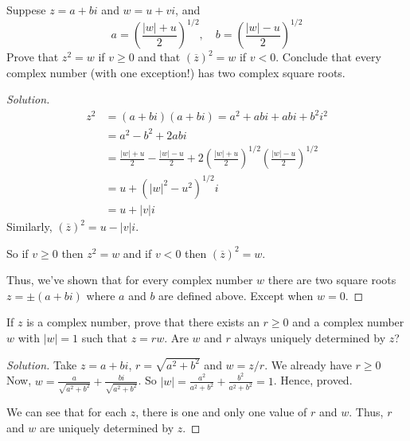 \begin{prblm}
    Suppese $z = a + bi$ and $w = u + vi$, and 
    $$  a = \left( \frac{|w| + u}{2} \right)^{1/2} , \quad
        b = \left( \frac{|w| - u}{2} \right)^{1/2} $$
    Prove that $z^2 = w$ if $v \geq 0$ and that $(\overline{z})^2 = w$ if $v < 0$.
    Conclude that every complex number (with one exception!) has two complex square roots.

    \begin{proof}[Solution]
        \begin{align*}
            z^2 & = (a + bi)(a + bi) = a^2 + abi + abi + b^2 i^2 \\
                & = a^2 - b^2 + 2abi \\
                & = \frac{|w|+u}{2} - \frac{|w|-u}{2} 
                    + 2 \left( \frac{|w|+u}{2} \right)^{1/2} \left( \frac{|w|-u}{2} \right)^{1/2} \\
                & = u + (|w|^2 - u^2)^{1/2} i \\
                & = u + |v|i
        \end{align*}
        Similarly, $(\overline{z})^2 = u - |v|i$. 
        
        So if $v \geq 0$ then $z^2 = w$ and if $v < 0$ then $(\overline{z})^2 = w$.

        Thus, we've shown that for every complex number $w$ there are two square roots $z = \pm ( a + bi )$ 
        where $a$ and $b$ are defined above. Except when $w = 0$.
    \end{proof}
\end{prblm}

\begin{prblm}
    If $z$ is a  complex number, prove that there exists an $r \geq 0$ and a complex number $w$ with $|w| = 1$ 
    such that $z = rw$. Are $w$ and $r$ always uniquely determined by $z$?
    \begin{proof}[Solution]
        Take $z = a + bi$, $r = \sqrt{a^2 + b^2}$ and $w = z / r$. We already have $r \geq 0$
        Now, $w = \frac{a}{\sqrt{a^2+b^2}} + \frac{bi}{\sqrt{a^2+b^2}}$.
        So $|w| = \frac{a^2}{a^2+b^2} + \frac{b^2}{a^2+b^2} = 1$. Hence, proved.
        
        We can see that for each $z$, there is one and only one value of $r$ and $w$.
        Thus, $r$ and $w$ are uniquely determined by $z$.

    \end{proof} 
\end{prblm}
